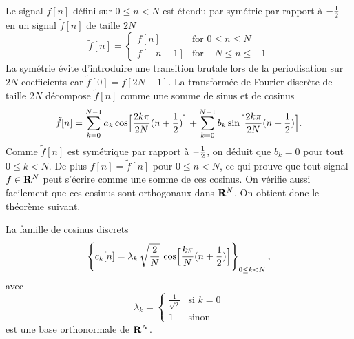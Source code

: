 Le signal $f[n]$ d\'efini sur $0 \leq n  < N$ 
est \'etendu par sym\'etrie par rapport \`a $- {\frac 1 2}$ en un
signal $\tilde f [n]$ de taille $2N$ 
\begin{equation} 
\tilde f[n] = 
   \left\{ \begin{array}{ll} 
        f[n]& \mbox {for $0 \leq n \leq N$}\\
        f[-n-1] &\mbox {for $-N \leq n \leq -1$}
            \end{array}
   \right.  
\end{equation}
La sym\'etrie \'evite d'introduire une transition brutale
lors de la periodisation sur $2N$ coefficients
car $\tilde f[0] = \tilde f[2N-1]$.
La transform\'ee de Fourier discr\`ete
de taille $2N$ d\'ecompose $\tilde f[n]$ comme une somme de 
sinus et de cosinus 
\[
\tilde f [n] = 
\sum_{k=0}^{N-1} a_k \cos \Bigl[\frac {2 k\pi} {2N} (n+{\frac 1 2})\Bigr] +
\sum_{k=0}^{N-1} b_k \sin \Bigl[\frac {2k\pi} {2N} (n+{\frac 1 2})\Bigr] .
\]
Comme $\tilde f [n]$ est sym\'etrique par rapport
\`a $-{\frac 1 2}$, on d\'eduit que
$b_k = 0$ pour tout $0 \leq k < N$.
De plus $f[n] = \tilde f[n]$ pour $0 \leq n <N$, ce qui prouve 
que tout signal $f \in {\bf{R}}^N$ peut s'\'ecrire comme une somme
de ces cosinus. On v\'erifie aussi facilement que ces
cosinus sont
orthogonaux dans ${\bf{R}}^N$. On obtient donc le th\'eor\`eme suivant.


\begin{theorem}
\label{th-discr-cos}
La famille de cosinus discrets
\[
\left\{ c_k [n] = {\lambda_k} \, \sqrt {\frac 2 N}\,
\cos\Bigl[\frac {k \pi} N (n+{\frac 1 2})\Bigr] \right\}_{ 0 \leq k < N},
\]
avec
\begin{equation} 
\lambda_k = 
   \left \{ \begin{array}{ll} 
            \frac 1 {\sqrt 2 } & \mbox{si $k = 0$} \\
            1 &  \mbox{sinon} 
            \end{array}
   \right.  
\end{equation}
est une base orthonormale de ${\bf{R}}^N$.
\end{theorem}

